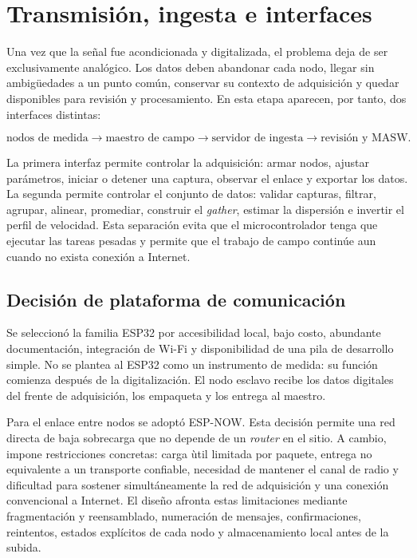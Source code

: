 \section{Transmisi\'on, ingesta e interfaces}
\label{sec:transmision-interfaces}

Una vez que la se\~nal fue acondicionada y digitalizada, el problema deja de ser
exclusivamente anal\'ogico. Los datos deben abandonar cada nodo, llegar sin
ambig\"uedades a un punto com\'un, conservar su contexto de adquisici\'on y quedar
disponibles para revisi\'on y procesamiento. En esta etapa aparecen, por tanto,
dos interfaces distintas:

\begin{equation}
\text{nodos de medida}
\longrightarrow
\text{maestro de campo}
\longrightarrow
\text{servidor de ingesta}
\longrightarrow
\text{revisi\'on y MASW}.
\end{equation}

La primera interfaz permite controlar la adquisici\'on: armar nodos, ajustar
par\'ametros, iniciar o detener una captura, observar el enlace y exportar los
datos. La segunda permite controlar el conjunto de datos: validar capturas,
filtrar, agrupar, alinear, promediar, construir el \emph{gather}, estimar la
dispersi\'on e invertir el perfil de velocidad. Esta separaci\'on evita que el
microcontrolador tenga que ejecutar las tareas pesadas y permite que el trabajo
de campo contin\'ue aun cuando no exista conexi\'on a Internet.

\subsection{Decisi\'on de plataforma de comunicaci\'on}

Se seleccion\'o la familia ESP32 por accesibilidad local, bajo costo, abundante
documentaci\'on, integraci\'on de Wi-Fi y disponibilidad de una pila de desarrollo
simple. No se plantea al ESP32 como un instrumento de medida: su funci\'on comienza
despu\'es de la digitalizaci\'on. El nodo esclavo recibe los datos digitales del
frente de adquisici\'on, los empaqueta y los entrega al maestro.

Para el enlace entre nodos se adopt\'o ESP-NOW. Esta decisi\'on permite una red
directa de baja sobrecarga que no depende de un \emph{router} en el sitio. A
cambio, impone restricciones concretas: carga \`util limitada por paquete,
entrega no equivalente a un transporte confiable, necesidad de mantener el canal
de radio y dificultad para sostener simult\'aneamente la red de adquisici\'on y
una conexi\'on convencional a Internet. El dise\~no afronta estas limitaciones
mediante fragmentaci\'on y reensamblado, numeraci\'on de mensajes, confirmaciones,
reintentos, estados expl\'icitos de cada nodo y almacenamiento local antes de la
subida.

